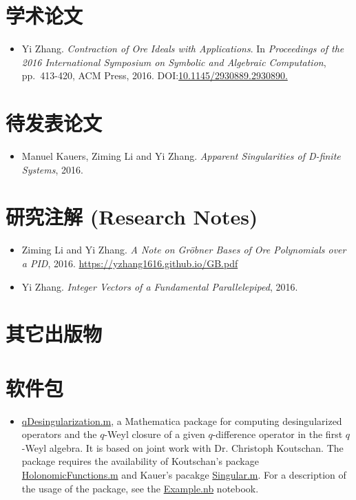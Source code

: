 \documentclass[a4paper,12pt]{article}
\begin{document}
\begin{CJK*}{UTF8}{gbsn}
\section*{\Large{学术论文}}
\begin{itemize}
 \item Yi Zhang. {\em Contraction of Ore Ideals with Applications}. 
       In {\em Proceedings of the 2016 International Symposium on Symbolic and Algebraic Computation}, 
       pp.\ 413-420, ACM Press, 2016. DOI:\href{http://dl.acm.org/citation.cfm?id=2930890}{10.1145/2930889.2930890.}
\end{itemize}

\section*{\Large{待发表论文}}
\begin{itemize}
 \item Manuel Kauers, Ziming Li and Yi Zhang. {\em Apparent Singularities of D-finite Systems}, 2016. 
\end{itemize}

\section*{\Large{研究注解 (Research Notes)}}
\begin{itemize}
 \item Ziming Li and Yi Zhang. {\em A Note on Gr\"{o}bner Bases of Ore Polynomials over a PID}, 2016. 
 \url{https://yzhang1616.github.io/GB.pdf} 
 \item Yi Zhang. {\em Integer Vectors of a Fundamental Parallelepiped}, 2016.
\end{itemize}

\section*{\Large{其它出版物}}

\section*{\Large{软件包}}
\begin{itemize}
 \item \href{https://yzhang1616.github.io/qDesingularization.m}{qDesingularization.m}, a Mathematica
     package for computing desingularized operators and the $q$-Weyl closure of
     a given $q$-difference operator in
     the first $q$-Weyl algebra. It is based on joint work with Dr. Christoph
     Koutschan. The package requires the availability of Koutschan's package
     \href{http://www.risc.jku.at/research/combinat/software/ergosum/RISC/HolonomicFunctions.html}{HolonomicFunctions.m}
     and Kauer's pacakge \href{https://www.risc.jku.at/research/combinat/risc/software/Singular/index.html}{Singular.m}.
     For a description of the usage of the package, see the \href{https://yzhang1616.github.io/Example.nb}{Example.nb} notebook. 
\end{itemize}


\end{CJK*}
\end{document}
